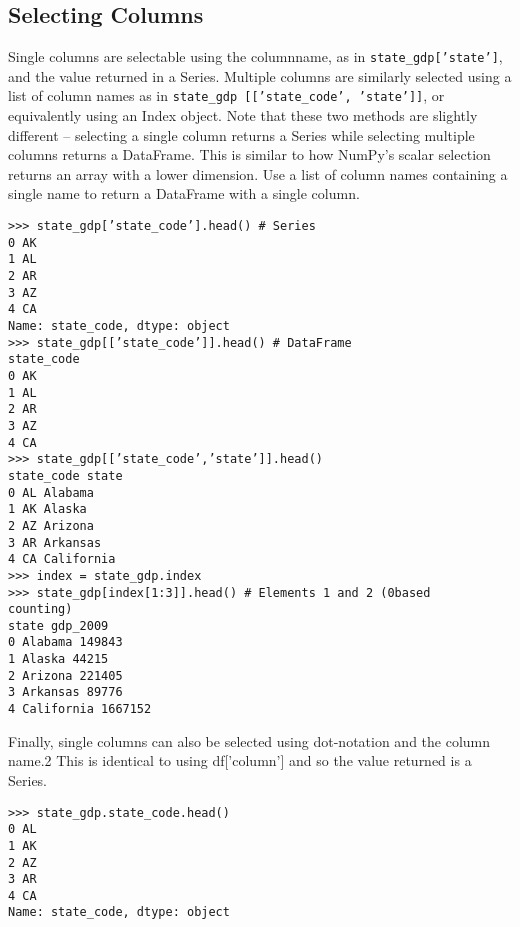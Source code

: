 \documentclass[KSmain.tex]{subfiles}
\begin{document}
\subsection{Selecting Columns}
Single columns are selectable using the columnname, as in \texttt{state\_gdp[’state’]}, and the value returned in
a Series. Multiple columns are similarly selected using a list of column names as in \texttt{state\_gdp [[’state\_code’,
’state’]]}, or equivalently using an Index object. Note that these two methods are slightly different – selecting
a single column returns a Series while selecting multiple columns returns a DataFrame. This is
similar to how NumPy’s scalar selection returns an array with a lower dimension. Use a list of column
names containing a single name to return a DataFrame with a single column.
\begin{framed}
\begin{verbatim}
>>> state_gdp[’state_code’].head() # Series
0 AK
1 AL
2 AR
3 AZ
4 CA
Name: state_code, dtype: object
>>> state_gdp[[’state_code’]].head() # DataFrame
state_code
0 AK
1 AL
2 AR
3 AZ
4 CA
>>> state_gdp[[’state_code’,’state’]].head()
state_code state
0 AL Alabama
1 AK Alaska
2 AZ Arizona
3 AR Arkansas
4 CA California
>>> index = state_gdp.index
>>> state_gdp[index[1:3]].head() # Elements 1 and 2 (0based
counting)
state gdp_2009
0 Alabama 149843
1 Alaska 44215
2 Arizona 221405
3 Arkansas 89776
4 California 1667152
\end{verbatim}
\end{framed}
Finally, single columns can also be selected using dot-notation and the column name.2 This is identical
to using df[’column’] and so the value returned is a Series.
\begin{framed}
\begin{verbatim}
>>> state_gdp.state_code.head()
0 AL
1 AK
2 AZ
3 AR
4 CA
Name: state_code, dtype: object
\end{verbatim}
\end{framed}
\end{document}
